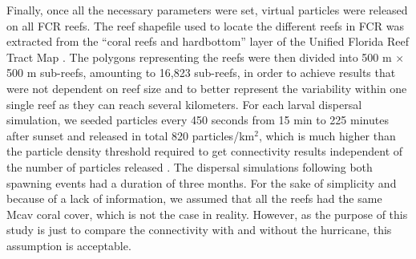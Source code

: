 \documentclass[fleqn,10pt]{wlscirep}
\begin{document}
Finally, once all the necessary parameters were set, virtual particles were released on all FCR reefs. The reef shapefile used to locate the different reefs in FCR was extracted from the “coral reefs and hardbottom” layer of the Unified Florida Reef Tract Map \citep{FWC2017Jan}. The polygons representing the reefs were then divided into 500 m $\times$ 500 m sub-reefs, amounting to 16,823 sub-reefs, in order to achieve results that were not dependent on reef size and to better represent the variability within one single reef as they can reach several kilometers. For each larval dispersal simulation, we seeded particles every 450 seconds from 15 min to 225 minutes after sunset and released in total 820 particles/km$^{2}$, which is much higher than the particle density threshold required to get connectivity results independent of the number of particles released \citep{Monroy2017Jan}. The dispersal simulations following both spawning events had a duration of three months. For the sake of simplicity and because of a lack of information, we assumed that all the reefs had the same Mcav coral cover, which is not the case in reality. However, as the purpose of this study is just to compare the connectivity with and without the hurricane, this assumption is acceptable.
\end{document}
